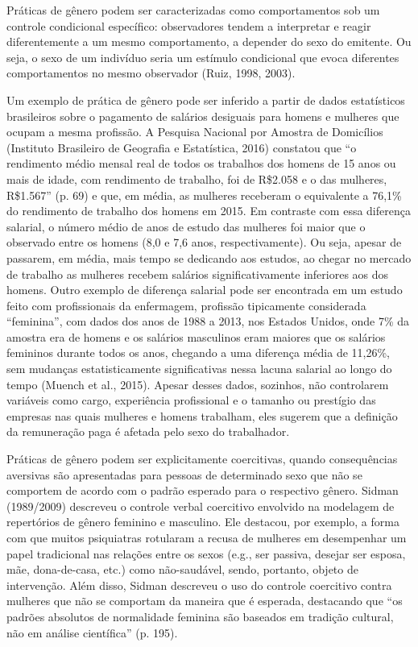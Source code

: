 Práticas de gênero podem ser caracterizadas como comportamentos sob um controle condicional específico: observadores tendem a interpretar e reagir diferentemente a um mesmo comportamento, a depender do sexo do emitente. Ou seja, o sexo de um indivíduo seria um estímulo condicional que evoca diferentes comportamentos no mesmo observador (Ruiz, 1998, 2003).

Um exemplo de prática de gênero pode ser inferido a partir de dados estatísticos brasileiros sobre o pagamento de salários desiguais para homens e mulheres que ocupam a mesma profissão. A Pesquisa Nacional por Amostra de Domicílios (Instituto Brasileiro de Geografia e Estatística, 2016) constatou que “o rendimento médio mensal real de todos os trabalhos dos homens de 15 anos ou mais de idade, com rendimento de trabalho, foi de R\$2.058 e o das mulheres, R\$1.567” (p. 69) e que, em média, as mulheres receberam o equivalente a 76,1\% do rendimento de trabalho dos homens em 2015. Em contraste com essa diferença salarial, o número médio de anos de estudo das mulheres foi maior que o observado entre os homens (8,0 e 7,6 anos, respectivamente). Ou seja, apesar de passarem, em média, mais tempo se dedicando aos estudos, ao chegar no mercado de trabalho as mulheres recebem salários significativamente inferiores aos dos homens. Outro exemplo de diferença salarial pode ser encontrada em um estudo feito com profissionais da enfermagem, profissão tipicamente considerada “feminina”, com dados dos anos de 1988 a 2013, nos Estados Unidos, onde 7\% da amostra era de homens e os salários masculinos eram maiores que os salários femininos durante todos os anos, chegando a uma diferença média de 11,26\%, sem mudanças estatisticamente significativas nessa lacuna salarial ao longo do tempo (Muench et al., 2015). Apesar desses dados, sozinhos, não controlarem variáveis como cargo, experiência profissional e o tamanho ou prestígio das empresas nas quais mulheres e homens trabalham, eles sugerem que a definição da remuneração paga é afetada pelo sexo do trabalhador.

Práticas de gênero podem ser explicitamente coercitivas, quando consequências aversivas são apresentadas para pessoas de determinado sexo que não se comportem de acordo com o padrão esperado para o respectivo gênero. Sidman (1989/2009) descreveu o controle verbal coercitivo envolvido na modelagem de repertórios de gênero feminino e masculino. Ele destacou, por exemplo, a forma com que muitos psiquiatras rotularam a recusa de mulheres em desempenhar um papel tradicional nas relações entre os sexos (e.g., ser passiva, desejar ser esposa, mãe, dona-de-casa, etc.) como não-saudável, sendo, portanto, objeto de intervenção. Além disso, Sidman descreveu o uso do controle coercitivo contra mulheres que não se comportam da maneira que é esperada, destacando que “os padrões absolutos de normalidade feminina são baseados em tradição cultural, não em análise científica” (p. 195).

